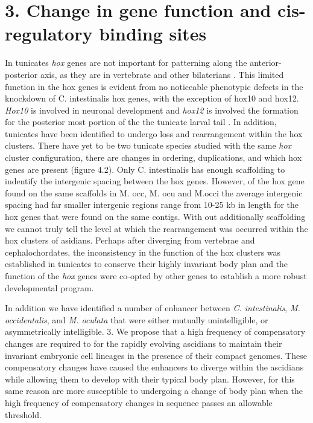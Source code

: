 \section{3.	Change in gene function and cis-regulatory binding sites}
In tunicates \textit{hox} genes are not important for patterning along the anterior-posterior axis, as they are in vertebrate and other bilaterians \cite{finnerty_origins_2003,mallo_regulation_2013,ikuta_limited_2010}. This limited function in the hox genes is evident from no noticeable phenotypic defects in the knockdown of C. intestinalis hox genes, with the exception of hox10 and hox12. \textit{Hox10} is involved in neuronal development and \textit{hox12} is involved the formation for the posterior most portion of the the tunicate larval tail \cite{ikuta_limited_2010}. In addition, tunicates have been identified to undergo loss and rearrangement within the hox clusters. There have yet to be two tunicate species studied with the same \textit{hox} cluster configuration, there are changes in ordering, duplications, and which hox genes are present (figure 4.2). Only C. intestinalis has enough scaffolding to indentify the intergenic spacing between the hox genes. However, of the hox gene found on the same scaffolds in M. occ, M. ocu and M.occi the average intergenic spacing had far smaller intergenic regions range from 10-25 kb in length for the hox genes that were found on the same contigs. With out additionally scaffolding we cannot truly tell the level at which the rearrangement was occurred within the hox clusters of asidians. Perhaps after diverging from vertebrae and cephalochordates, the inconsistency in the function of the hox clusters was established in tunicates to conserve their highly invariant  body plan and the function of the \textit{hox} genes  were co-opted by other genes to establish a more robust developmental program. %

In addition we have identified a number of enhancer between \textit{C. intestinalis}, \textit{M. occidentalis}, and \textit{M. oculata} that were either mutually unintelligible, or asymmetrically intelligible. 3.	We propose that a high frequency of compensatory changes are required to for the rapidly evolving ascidians to maintain their invariant embryonic cell lineages in the presence of their compact genomes. These compensatory changes have caused the enhancers to diverge within the ascidians while allowing them to develop with their typical body plan. However, for this same reason are more susceptible to undergoing a change of body plan when the high frequency of compensatory changes in sequence passes an allowable threshold.

